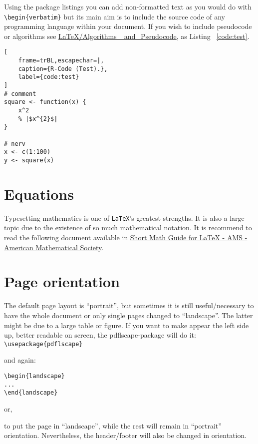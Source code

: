 Using the package listings you can add non-formatted text as you would do with \verb!\begin{verbatim}! but its main aim is to include the source code of any programming language within your document. If you wish to include pseudocode or algorithms see \href{http://en.wikibooks.org/wiki/LaTeX/Algorithms_and_Pseudocode}{LaTeX/Algorithms\_ and\_Pseudocode}, as Listing ~\ref{code:test}.

\begin{minipage}{\textwidth}
\lstset{language=R,numbers=left}
\begin{lstlisting}[
    frame=trBL,escapechar=|,
    caption={R-Code (Test).},
    label={code:test}
]
# comment
square <- function(x) {
    x^2
    % |$x^{2}$|
}

# nerv
x <- c(1:100)
y <- square(x)
\end{lstlisting}
\end{minipage}

\section{Equations}

Typesetting mathematics is one of \texttt{LaTeX}'s greatest strengths. It is also a large topic due to the existence of so much mathematical notation. It is recommend to read the following document available in \href{http://www.google.pt/url?sa=t&rct=j&q=&esrc=s&source=web&cd=1&cad=rja&ved=0CB4QFjAA&url=ftp%3A%2F%2Fftp.ams.org%2Fpub%2Ftex%2Fdoc%2Famsmath%2Fshort-math-guide.pdf&ei=DkScUOm8IJC5hAei7oGQDg&usg=AFQjCNEHl1pXuurNmXAdqfC0z-pPAbDyUw}{Short Math Guide for LaTeX - AMS - American Mathematical Society}.

\section{Page orientation}

\begin{sloppypar}
The default page layout is ``portrait'', but sometimes it is still useful/necessary to have the whole document or only single pages changed to ``landscape''. The latter might be due to a large table or figure. If you want to make appear the left side up, better readable on screen, the pdflscape-package will do it:
\verb!\usepackage{pdflscape}!
\end{sloppypar}
and again:
\begin{verbatim}
\begin{landscape}
...
\end{landscape}
\end{verbatim}

or, 
\verb!!

to put the page in ``landscape'', while the rest will remain in ``portrait'' orientation. Nevertheless, the header/footer will also be changed in orientation.


